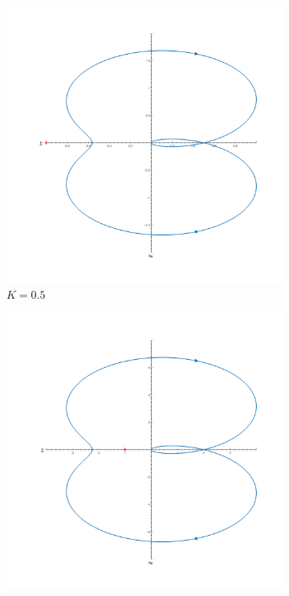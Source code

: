 \begin{figure}[ht!]
\begin{subfigure}{0.5\textwidth}
        \includegraphics[width=\textwidth]{media/plots/task4_nyquist_2.png}
        \caption{$K = 0.5$}
    \end{subfigure}
    \begin{subfigure}{0.5\textwidth}
        \centering
        \includegraphics[width=\textwidth]{media/plots/task4_nyquist_3.png}

\end{subfigure}
\end{figure}
